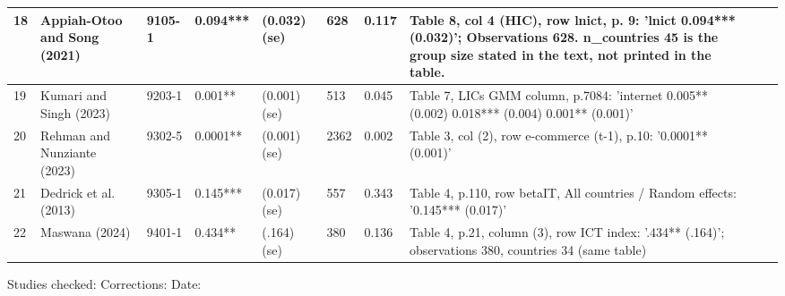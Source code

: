 \documentclass[10pt,a4paper]{article}
\begin{document}
\begin{longtable}{@{}p{0.6cm}p{2.7cm}p{1.6cm}p{2.0cm}p{1.2cm}p{1.0cm}p{0.9cm}p{4.8cm}p{1.5cm}p{1.6cm}@{}}
18 & Appiah-Otoo and Song (2021) & 9105-1 & 0.094*** & (0.032) (se) & 628 & 0.117 & Table 8, col 4 (HIC), row lnict, p. 9: 'lnict 0.094*** (0.032)'; Observations 628. n\_countries 45 is the group size stated in the text, not printed in the table. & & \\ \midrule
19 & Kumari and Singh (2023) & 9203-1 & 0.001** & (0.001) (se) & 513 & 0.045 & Table 7, LICs GMM column, p.7084: 'internet 0.005** (0.002) 0.018*** (0.004) 0.001** (0.001)' & & \\ \midrule
20 & Rehman and Nunziante (2023) & 9302-5 & 0.0001** & (0.001) (se) & 2362 & 0.002 & Table 3, col (2), row e-commerce (t-1), p.10: '0.0001** (0.001)' & & \\ \midrule
21 & Dedrick et al. (2013) & 9305-1 & 0.145*** & (0.017) (se) & 557 & 0.343 & Table 4, p.110, row betaIT, All countries / Random effects: '0.145*** (0.017)' & & \\ \midrule
22 & Maswana (2024) & 9401-1 & 0.434** & (.164) (se) & 380 & 0.136 & Table 4, p.21, column (3), row ICT index: '.434** (.164)'; observations 380, countries 34 (same table) & & \\ \midrule
\end{longtable}
\par\medskip\normalsize Studies checked: \underline{\hspace{2cm}} \quad Corrections: \underline{\hspace{2cm}} \quad Date: \underline{\hspace{3cm}}
\end{document}
